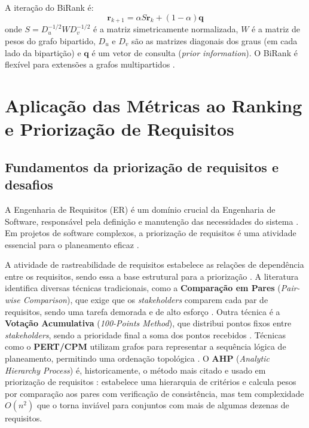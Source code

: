 A iteração do BiRank é:
\begin{equation}
    \mathbf{r}_{k+1} = \alpha S\mathbf{r}_{k} + (1 - \alpha)\mathbf{q}
    \label{eq:birank}
\end{equation}
onde $S = D_{u}^{-1/2} W D_{v}^{-1/2}$ é a matriz simetricamente
normalizada, $W$ é a matriz de pesos do grafo bipartido, $D_u$ e $D_v$
são as matrizes diagonais dos graus (em cada lado da bipartição) e
$\mathbf{q}$ é um vetor de consulta (\emph{prior information}). O
BiRank é flexível para extensões a grafos multipartidos
\parencite{he2015}.

\section{Aplicação das Métricas ao Ranking e Priorização de Requisitos}
\label{sec:re}

\subsection{Fundamentos da priorização de requisitos e desafios}
\label{sec:re-fundamentos}

A Engenharia de Requisitos (ER) é um domínio crucial da Engenharia de
Software, responsável pela definição e manutenção das necessidades do
sistema \parencite{sommerville2007}. Em projetos de software
complexos, a priorização de requisitos é uma atividade essencial para
o planeamento eficaz \parencite{karlsson2002, berander2005}.

A atividade de rastreabilidade de requisitos estabelece as relações
de dependência entre os requisitos, sendo essa a base estrutural para
a priorização \parencite{gotel1994, sommerville2007}. A literatura
identifica diversas técnicas tradicionais, como a \textbf{Comparação
em Pares} (\emph{Pair-wise Comparison}), que exige que os
\emph{stakeholders} comparem cada par de requisitos, sendo uma tarefa
demorada e de alto esforço \parencite{karlsson2007, karlsson1997}.
Outra técnica é a \textbf{Votação Acumulativa} (\emph{100-Points
Method}), que distribui pontos fixos entre \emph{stakeholders}, sendo
a prioridade final a soma dos pontos recebidos
\parencite{ahl2005, leffingwell2003}. Técnicas como o
\textbf{PERT/CPM} utilizam grafos para representar a sequência lógica
de planeamento, permitindo uma ordenação topológica
\parencite{kerzner2009}. O \textbf{AHP} (\emph{Analytic Hierarchy
Process}) \parencite{saaty1980} é, historicamente, o método mais
citado e usado em priorização de requisitos
\parencite{karlsson1997, berander2005}: estabelece uma hierarquia de
critérios e calcula pesos por comparação aos pares com verificação
de consistência, mas tem complexidade $O(n^2)$ que o torna inviável
para conjuntos com mais de algumas dezenas de requisitos.

